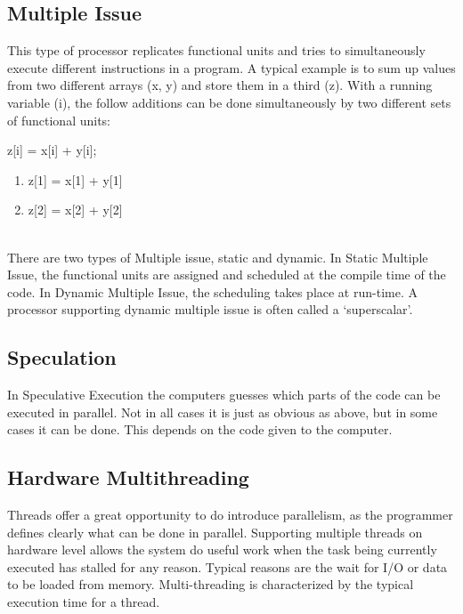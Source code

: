 \documentclass{article}
\begin{document}
\subsection{Multiple Issue} %
\label{sub:multiple_issue}
	This type of processor replicates functional units
	and tries to simultaneously execute different instructions in a program.
	A typical example is to sum up values from two different arrays (x, y)
	and store them in a third (z).
	With a running variable (i),
	the follow additions can be done simultaneously by two different sets of functional units:\\
	\begin{center}
		z[i] = x[i] + y[i];
		\begin{enumerate}
			\item z[1] = x[1] + y[1]
			\item z[2] = x[2] + y[2]
		\end{enumerate}
	\end{center}
	\\
	There are two types of Multiple issue, static and dynamic.
	In Static Multiple Issue, the functional units are assigned
	and scheduled at the compile time of the code.
	In Dynamic Multiple Issue, the scheduling takes place at run-time.
	A processor supporting dynamic multiple issue is often called a ‘superscalar’.

\subsection{Speculation} %
\label{sub:speculation}
	In Speculative Execution the computers guesses which parts of the code can be executed in parallel.
	Not in all cases it is just as obvious as above,
	but in some cases it can be done.
	This depends on the code given to the computer.

\subsection{Hardware Multithreading} %
\label{sub:hardware_multithreading}
	Threads offer a great opportunity to do introduce parallelism,
	as the programmer defines clearly what can be done in parallel.
	Supporting multiple threads on hardware level allows the system do useful work
	when the task being currently executed has stalled for any reason.
	Typical reasons are the wait for I/O or data to be loaded from memory.
	Multi-threading is characterized by the typical execution time for a thread.
\end{document}
